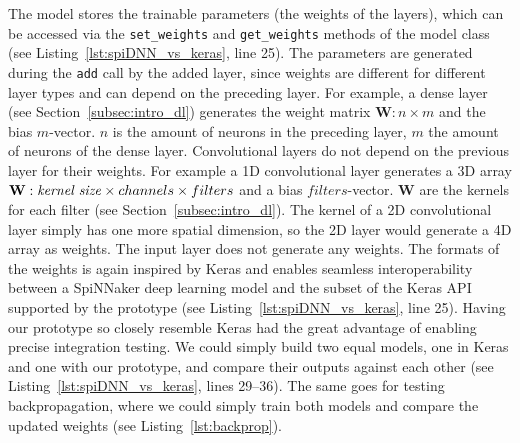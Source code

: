 \documentclass[]{article}
\begin{document}
The model stores the trainable parameters (the weights of the layers),
which can be accessed via the \texttt{set\_weights} and
\texttt{get\_weights} methods of the model class
(see Listing~\ref{lst:spiDNN_vs_keras}, line 25).
The parameters are generated during the \texttt{add} call by the
added layer, since weights are different for different layer types
and can depend on the preceding layer.
For example, a dense layer (see Section~\ref{subsec:intro_dl})
generates the weight matrix $\mathbf{W}: n \times m$ and the bias
$m$-vector.
$n$ is the amount of neurons in the preceding layer, $m$ the amount of
neurons of the dense layer.
Convolutional layers do not depend on the previous layer for their
weights.
For example a 1D convolutional layer generates a $3$D array
$\mathbf{W}: \text{\textit{kernel size}} \times channels \times
filters$ and a bias $filters$-vector.
$\mathbf{W}$ are the kernels for each filter (see
Section~\ref{subsec:intro_dl}).
The kernel of a 2D convolutional layer simply has one more spatial
dimension, so the 2D layer would generate a 4D array as weights.
The input layer does not generate any weights.
The formats of the weights is again inspired by Keras and enables
seamless interoperability between a SpiNNaker deep learning model and
the subset of the Keras API supported by the prototype
(see Listing~\ref{lst:spiDNN_vs_keras}, line 25).
Having our prototype so closely resemble Keras had the great advantage
of enabling precise integration testing.
We could simply build two equal models, one in Keras and one with our
prototype, and compare their outputs against each other
(see Listing~\ref{lst:spiDNN_vs_keras}, lines 29--36).
The same goes for testing backpropagation, where we could simply train
both models and compare the updated weights
(see Listing~\ref{lst:backprop}).
\end{document}
